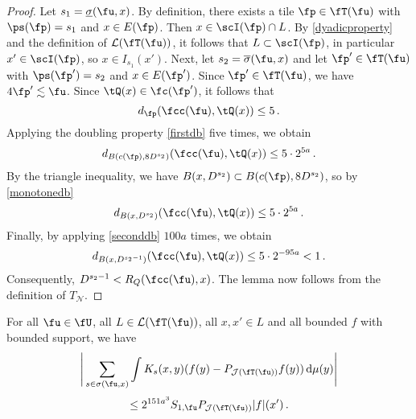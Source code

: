 \begin{proof}
    \leanok
    Let $s_1 = \underline{\sigma}(\fu, x)$. By definition, there exists a tile $\fp \in \fT(\fu)$ with $\ps(\fp) = s_1$ and $x \in E(\fp)$. Then $x \in \scI(\fp) \cap L$. By \eqref{dyadicproperty} and the definition of $\mathcal{L}(\fT(\fu))$, it follows that $L \subset \scI(\fp)$, in particular $x' \in \scI(\fp)$, so $x \in I_{s_1}(x')$.
    Next, let $s_2 = \overline{\sigma}(\fu, x)$ and let $\fp' \in \fT(\fu)$ with $\ps(\fp') = s_2$ and $x \in E(\fp')$. Since $\fp' \in \fT(\fu)$, we have $4\fp' \lesssim \fu$. Since $\tQ(x) \in \fc(\fp')$, it follows that
    $$
        d_{\fp}(\fcc(\fu), \tQ(x)) \le 5\,.
    $$
    Applying the doubling property \eqref{firstdb} five times, we obtain
    $$
        d_{B(c(\fp), 8D^{s_2})}(\fcc(\fu), \tQ(x)) \le 5 \cdot 2^{5a}\,.
    $$
    By the triangle inequality, we have $B(x, D^{s_2}) \subset B(c(\fp), 8 D^{s_2})$, so by \eqref{monotonedb}
    $$
        d_{B(x, D^{s_2})}(\fcc(\fu), \tQ(x)) \le 5 \cdot 2^{5a}\,.
    $$
    Finally, by applying \eqref{seconddb} $100a$ times, we obtain
    $$
        d_{B(x, D^{s_2-1})}(\fcc(\fu), \tQ(x)) \le 5 \cdot 2^{-95a} < 1\,.
    $$
    Consequently, $D^{s_2 - 1} < R_Q(\fcc(\fu), x)$.
    The lemma now follows from the definition of $T_{\mathcal{N}}$.
\end{proof}

\begin{lemma}
    \label{third-tree-pointwise}
    \leanok
    For all $\fu \in \fU$, all $L \in \mathcal{L}(\fT(\fu))$, all $x, x' \in L$ and all bounded $f$ with bounded support, we have
    \begin{equation*}
        \Bigg| \sum_{s \in \sigma(\fu, x)} \int K_s(x,y) (f(y) - P_{\mathcal{J}(\fT(\fu))} f(y)) \, \mathrm{d}\mu(y) \Bigg|
    \end{equation*}
    \begin{equation*}
          \le 2^{151a^3} S_{1,\fu} P_{\mathcal{J}(\fT(\fu))}|f|(x')\,.
    \end{equation*}
\end{lemma}

